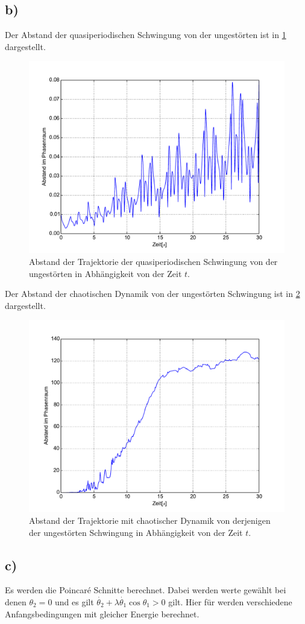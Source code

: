 \subsection*{b)}
Der Abstand der quasiperiodischen Schwingung von der ungestörten ist in \cref{fig:abstand1} dargestellt.
\begin{figure}[H]
	\includegraphics[width = \textwidth]{../Plots/Plot_2_B_1.pdf}
	\caption{Abstand der Trajektorie der quasiperiodischen Schwingung von der ungestörten in Abhängigkeit von der Zeit $t$.\label{fig:abstand1}}
\end{figure}
Der Abstand der chaotischen Dynamik von der ungestörten Schwingung ist in \cref{fig:abstand2} dargestellt.
\begin{figure}[H]
	\includegraphics[width = \textwidth]{../Plots/Plot_2_B_2.pdf}
	\caption{Abstand der Trajektorie mit chaotischer Dynamik von derjenigen der ungestörten Schwingung in Abhängigkeit von der Zeit $t$.\label{fig:abstand2}}
\end{figure}

\subsection*{c)}
Es werden die Poincaré Schnitte berechnet.
Dabei werden werte gewählt bei denen $\theta_2=0$ und es gilt $\dot{\theta_2}+\lambda\dot{\theta_1}\cos\theta_1>0$ gilt.
Hier für werden verschiedene Anfangsbedingungen mit gleicher Energie berechnet.
